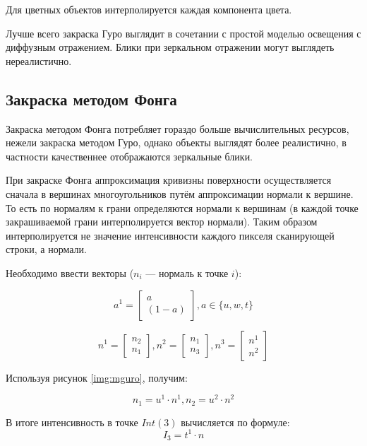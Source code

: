\begin{enumerate}
Для цветных объектов интерполируется каждая компонента цвета.

Лучше всего закраска Гуро выглядит в сочетании с простой моделью освещения с диффузным отражением. Блики при зеркальном отражении могут выглядеть нереалистично.

\subsection{Закраска методом Фонга}

Закраска методом Фонга потребляет гораздо больше вычислительных ресурсов, нежели закраска методом Гуро, однако объекты выглядят более реалистично, в частности качественнее отображаются зеркальные блики.

При закраске Фонга аппроксимация кривизны поверхности осуществляется сначала в вершинах многоугольников путём аппроксимации нормали к вершине. То есть по нормалям к грани определяются нормали к вершинам (в каждой точке закрашиваемой грани интерполируется вектор нормали). Таким образом интерполируется не значение интенсивности каждого пикселя сканирующей строки, а нормали.

Необходимо ввести векторы ($n_i$ --- нормаль к точке $i$):

\begin{equation}
	a^1 = \begin{bmatrix}
		a\\
		(1-a)
	\end{bmatrix}, a \in \{u, w, t\}
\end{equation}

\begin{equation}
	n^1 = \begin{bmatrix}
		n_2\\
		n_1
	\end{bmatrix},
	n^2 = \begin{bmatrix}
		n_1\\
		n_3
	\end{bmatrix},
	n^3 = \begin{bmatrix}
		n^1\\
		n^2
	\end{bmatrix}
\end{equation}

Используя рисунок \ref{img:mguro}, получим:

\begin{equation}
	n_1 = u^1 \cdot n^1,
	n_2 = u^2 \cdot n^2
\end{equation}

В итоге интенсивность в точке $Int(3)$ вычисляется по формуле:
\begin{equation}
	I_3 = t^1 \cdot n
\end{equation}


\end{enumerate}
